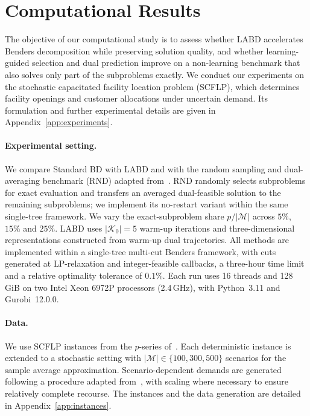\section{Computational Results}\label{sec:results}

The objective of our computational study is to assess whether LABD accelerates Benders decomposition while preserving solution quality, and whether learning-guided selection and dual prediction improve on a non-learning benchmark that also solves only part of the subproblems exactly. We conduct our experiments on the stochastic capacitated facility location problem (SCFLP), which determines facility openings and customer allocations under uncertain demand. Its formulation and further experimental details are given in Appendix~\ref{app:experiments}.

\paragraph{Experimental setting.} We compare Standard BD with LABD and with the random sampling and dual-averaging benchmark (RND) adapted from~\cite{bertsimas2024stochastic}. RND randomly selects subproblems for exact evaluation and transfers an averaged dual-feasible solution to the remaining subproblems; we implement its no-restart variant within the same single-tree framework. We vary the exact-subproblem share $p/|\mathcal M|$ across $5\%$, $15\%$ and $25\%$. LABD uses $|\mathcal K_0|=5$ warm-up iterations and three-dimensional representations constructed from warm-up dual trajectories. All methods are implemented within a single-tree multi-cut Benders framework, with cuts generated at LP-relaxation and integer-feasible callbacks, a three-hour time limit and a relative optimality tolerance of $0.1\%$. Each run uses 16 threads and 128\,GiB on two Intel Xeon 6972P processors (2.4\,GHz), with Python~3.11 and Gurobi~12.0.0.

\paragraph{Data.} We use SCFLP instances from the $p$-series of~\cite{holmberg1999exact}. Each deterministic instance is extended to a stochastic setting with $|\mathcal M|\in\{100,300,500\}$ scenarios for the sample average approximation. Scenario-dependent demands are generated following a procedure adapted from~\cite{bodur2017strengthened}, with scaling where necessary to ensure relatively complete recourse. The instances and the data generation are detailed in Appendix~\ref{app:instances}.


